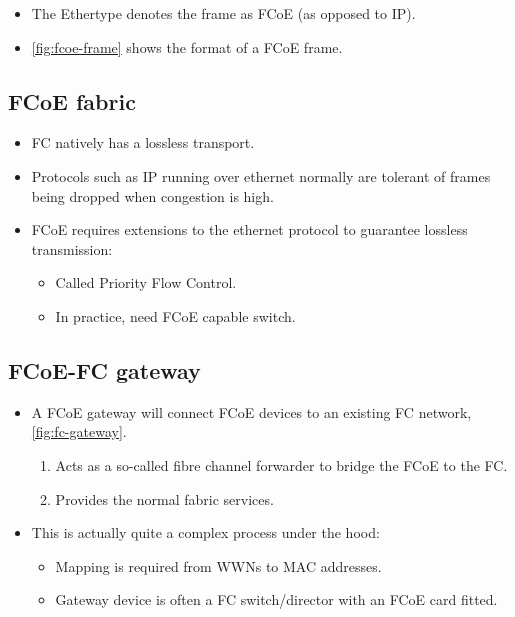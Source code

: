 \documentclass[slides]{pgnotes}
\begin{document}
\begin{itemize}
\item The Ethertype denotes the frame as FCoE (as opposed to IP).
\item \autoref{fig:fcoe-frame} shows the format of a FCoE frame.
\end{itemize}
  

\subsection{FCoE fabric}
\label{sec:fcoe-fabric}

\begin{itemize}
\item FC natively has a lossless transport.
\item Protocols such as IP running over ethernet normally are tolerant of frames being dropped when congestion is high.
\item FCoE requires extensions to the ethernet protocol to guarantee lossless transmission:
  \begin{itemize}
  \item Called Priority Flow Control.
  \item In practice, need FCoE capable switch.
  \end{itemize}
\end{itemize}  
  

\subsection{FCoE-FC gateway}
\label{sec:fcoe-fc-gateway}

\begin{itemize}
\item A FCoE gateway will connect FCoE devices to an existing FC network, \autoref{fig:fc-gateway}.
  \begin{enumerate}
  \item Acts as a so-called fibre channel forwarder to bridge the FCoE to the FC.
  \item Provides the normal fabric services.
  \end{enumerate}
\item This is actually quite a complex process under the hood:
  \begin{itemize}
  \item Mapping is required from WWNs to MAC addresses.
  \item Gateway device is often a FC switch/director with an FCoE card fitted.
  \end{itemize}
\end{itemize}
\end{document}
